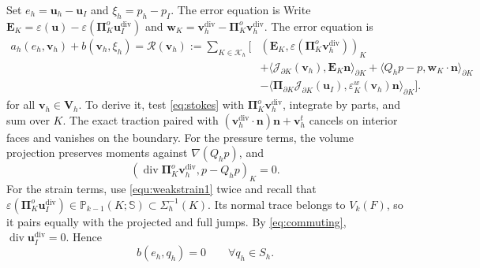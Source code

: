 \documentclass[review,hidelinks,onefignum,onetabnum]{siamart251216}
\begin{document}
Set $e_h=\boldsymbol u_h-\boldsymbol u_I$ and $\xi_h=p_h-p_I$.
The error equation is
Write $\boldsymbol E_K=\varepsilon(\boldsymbol u)-
\varepsilon(\boldsymbol\Pi_K^o\boldsymbol u_I^{\operatorname{div}})$ and
$\boldsymbol w_K=\boldsymbol v_h^{\operatorname{div}}-
\boldsymbol\Pi_K^o\boldsymbol v_h^{\operatorname{div}}$.
The error equation is
\begin{equation}\label{eq:erroreq}
\begin{aligned}
a_h(e_h,\boldsymbol v_h)+b(\boldsymbol v_h,\xi_h)
=\mathcal R(\boldsymbol v_h):=\sum_{K\in\mathcal K_h}\bigl[&
(\boldsymbol E_K,\varepsilon(\boldsymbol\Pi_K^o\boldsymbol v_h^{\operatorname{div}}))_K\\
&+\langle\mathcal J_{\partial K}(\boldsymbol v_h),\boldsymbol E_K\boldsymbol n\rangle_{\partial K}
+\langle Q_hp-p,\boldsymbol w_K\cdot\boldsymbol n\rangle_{\partial K}\\
&-\langle\boldsymbol\Pi_{\partial K}\mathcal J_{\partial K}(\boldsymbol u_I),
\varepsilon_K^w(\boldsymbol v_h)\boldsymbol n\rangle_{\partial K}\bigr].
\end{aligned}
\end{equation}
for all $\boldsymbol v_h\in\boldsymbol V_h$.
To derive it, test \eqref{eq:stokes} with
$\boldsymbol\Pi_K^o\boldsymbol v_h^{\operatorname{div}}$, integrate by parts,
and sum over $K$. The exact traction paired with
$(\boldsymbol v_h^{\operatorname{div}}\cdot\boldsymbol n)\boldsymbol n+\boldsymbol v_h^t$
cancels on interior faces and vanishes on the boundary.
For the pressure terms, the volume projection preserves moments against
$\nabla(Q_hp)$, and
\[
(\operatorname{div}\boldsymbol\Pi_K^o\boldsymbol v_h^{\operatorname{div}},p-Q_hp)_K=0.
\]
For the strain terms, use \eqref{equ:weakstrain1} twice and recall that
$\varepsilon(\boldsymbol\Pi_K^o\boldsymbol u_I^{\operatorname{div}})
\in\mathbb P_{k-1}(K;\mathbb S)\subset\Sigma_h^{-1}(K)$.
Its normal trace belongs to $V_k(F)$, so it pairs equally with the projected
and full jumps.
By \eqref{eq:commuting}, $\operatorname{div}\boldsymbol u_I^{\operatorname{div}}=0$.
Hence
\begin{equation}\label{eq:divergenceerror}
b(e_h,q_h)=0\qquad\forall q_h\in S_h.
\end{equation}
\end{document}
